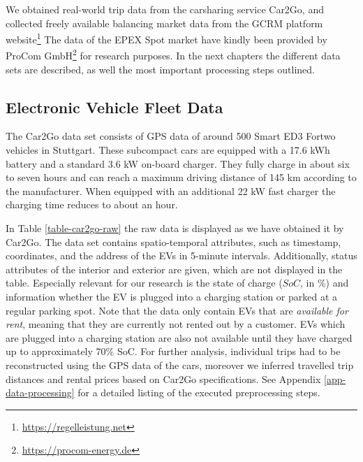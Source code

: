 \documentclass[a4paper, 12pt]{article}
\begin{document}
We obtained real-world trip data from the carsharing service Car2Go, and
collected freely available balancing market data from the GCRM platform
website\footnote{\url{https://regelleistung.net}} The data of the EPEX Spot market have kindly been provided by
ProCom GmbH\footnote{\url{https://procom-energy.de}} for research purposes. In the next chapters the different
data sets are described, as well the most important processing steps outlined.

\subsection{Electronic Vehicle Fleet Data \label{sec-data-car2go}}
\label{sec:org1dcd333}
The Car2Go data set consists of GPS data of around 500 Smart ED3 Fortwo vehicles
in Stuttgart. These subcompact cars are equipped with a 17.6 kWh battery and a
standard 3.6 kW on-board charger. They fully charge in about six to seven hours
and can reach a maximum driving distance of 145 km according to the manufacturer.
When equipped with an additional 22 kW fast charger the charging time reduces to
about an hour.

In Table \ref{table-car2go-raw} the raw data is displayed as we have obtained it
by Car2Go. The data set contains spatio-temporal attributes, such as timestamp,
coordinates, and the address of the EVs in 5-minute intervals. Additionally,
status attributes of the interior and exterior are given, which are not
displayed in the table. Especially relevant for our research is the state of
charge (\(SoC\), in \%) and information whether the EV is plugged into a charging
station or parked at a regular parking spot. Note that the data only contain EVs
that are \emph{available for rent}, meaning that they are currently not rented out by
a customer. EVs which are plugged into a charging station are also not available
until they have charged up to approximately 70\% SoC. For further analysis,
individual trips had to be reconstructed using the GPS data of the cars,
moreover we inferred travelled trip distances and rental prices based on Car2Go
specifications. See Appendix \ref{app-data-processing} for a detailed listing of
the executed preprocessing steps.
\end{document}
